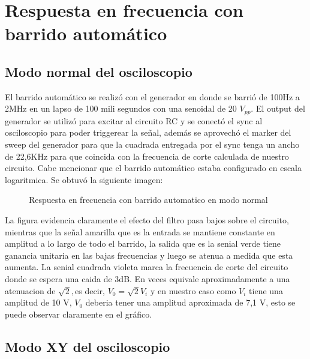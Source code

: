 \section{Respuesta en frecuencia con barrido automático}

\subsection{Modo normal del osciloscopio}

El barrido automático se realizó con el generador en donde se barrió
de 100Hz a 2MHz en un lapso de 100 mili segundos con una senoidal
de 20 $V_{pp}$. El output del generador se utilizó para excitar al
circuito RC y se conectó el sync al osciloscopio para poder triggerear
la señal, además se aprovechó el marker del sweep del generador para
que la cuadrada entregada por el sync tenga un ancho de 22,6KHz para
que coincida con la frecuencia de corte calculada de nuestro circuito.
Cabe mencionar que el barrido automático estaba configurado en escala
logaritmica. Se obtuvó la siguiente imagen:

\begin{figure}[H]
\begin{center}
\par\end{center}
\caption{Respuesta en frecuencia con barrido automatico en modo normal}
\end{figure}

La figura evidencia claramente el efecto del filtro pasa bajos sobre
el circuito, mientras que la señal amarilla que es la entrada se
mantiene constante en amplitud a lo largo de todo el barrido, la salida
que es la senial verde tiene ganancia unitaria en las bajas frecuencias
y luego se atenua a medida que esta aumenta. La senial cuadrada violeta
marca la frecuencia de corte del circuito donde se espera una caida
de 3dB. En veces equivale aproximadamente a una atenuacion de $\sqrt{2},$es
decir, $V_{0}=\sqrt{2}V_{i}$ y en nuestro caso como $V_{i}$ tiene
una amplitud de 10 V, $V_{0}$ deberia tener una amplitud aproximada
de 7,1 V, esto se puede observar claramente en el gráfico.

\subsection{Modo XY del osciloscopio}


